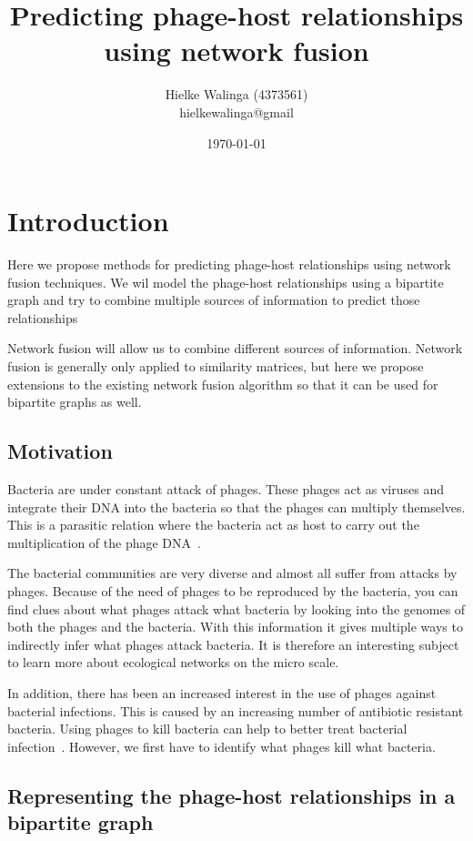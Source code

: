 \documentclass{article}
\title{Predicting phage-host relationships using network fusion}
\author{Hielke Walinga (4373561) \\ hielkewalinga@gmail}
\date{\today}
\begin{document}
\maketitle

\section{Introduction}

Here we propose methods for predicting phage-host relationships 
using network fusion techniques. 
We wil model the phage-host relationships using a bipartite graph
and try to combine multiple sources of information to predict
those relationships

Network fusion will allow us to combine different sources of information.
Network fusion is generally only applied to similarity matrices,
but here we propose extensions to the existing network fusion algorithm so that it 
can be used for bipartite graphs as well.

\subsection{Motivation}

Bacteria are under constant attack of phages. These phages act as viruses and
integrate their DNA into the bacteria so that the phages can multiply themselves.
This is a parasitic relation where the bacteria act as host to carry out the
multiplication of the phage DNA~\cite{seed2015battling}.

The bacterial communities are very diverse and almost all suffer from
attacks by phages. Because of the need of phages to be reproduced by the bacteria,
you can find clues about what phages attack what bacteria by looking into
the genomes of both the phages and the bacteria.
With this information it gives multiple ways to indirectly infer what phages attack bacteria.
It is therefore an interesting subject to learn more about ecological 
networks on the micro scale.

In addition, there has been an increased interest in the use of phages against
bacterial infections. This is caused by an increasing number 
of antibiotic resistant bacteria. Using phages to 
kill bacteria can help to better treat bacterial infection~\cite{nobrega2015revisiting}.
However, we first have to identify what phages kill what bacteria.

\subsection{Representing the phage-host relationships in a bipartite graph}
\end{document}
